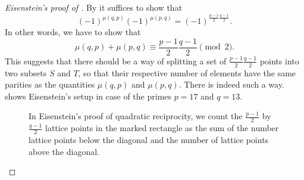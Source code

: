 \begin{proof}[Eisenstein's proof of ]
  By  it suffices to show that
  \begin{equation*}
    (-1)^{\mu(q,p)}(-1)^{\mu(p,q)}=(-1)^{\frac{p-1}{2}\frac{q-1}{2}}.
  \end{equation*}
  In other words, we have to show that
  \begin{equation*}
    \mu(q,p)+\mu(p,q)\equiv \frac{p-1}{2}\frac{q-1}{2}\pmod{2}.
  \end{equation*}
  This suggests that there should be a way of splitting a set of $\frac{p-1}{2}\frac{q-1}{2}$ points into two subsets $S$ and $T$, so that their respective number of elements have the same parities as the quantities $\mu(q,p)$ and $\mu(p,q)$. There is indeed such a way.  shows Eisenstein's setup in case of the primes $p=17$ and $q=13$. 
  
  \begin{figure}[t]
    \centering
    \caption[Eisenstein's proof of quadratic reciprocity]{\label{figure:eisenstein-quadratic-reciprocity}In Eisenstein's proof of quadratic reciprocity, we count the $\frac{p-1}{2}$ by $\frac{q-1}{2}$ lattice points in the marked rectangle as the sum of the number lattice points below the diagonal and the number of lattice points above the diagonal.}
  \end{figure}  
  

\end{proof}
